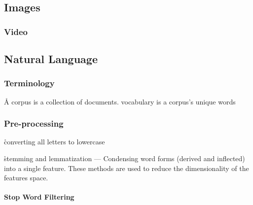 

\subsection{Images}



\subsubsection{Video}



\subsection{Natural Language}


\subsubsection{Terminology}

\r{A {corpus} is a collection of documents. {vocabulary} is a corpus's unique words}

\subsubsection{Pre-processing}


\r{converting all letters to lowercase}

\r{stemming and lemmatization --- Condensing word forms (derived and inflected) into a single feature. These methods are used to reduce the dimensionality of the features space.}

\paragraph{Stop Word Filtering}

